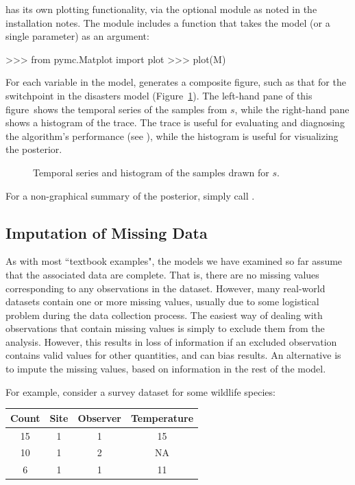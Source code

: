 \documentclass[]{jss}
\begin{document}
 has its own plotting functionality, via the optional
 module as noted in the installation notes. The
 module includes a  function that takes the
model (or a single parameter) as an argument:
\begin{CodeInput}
>>> from pymc.Matplot import plot
>>> plot(M)
\end{CodeInput}
For each variable in the model,  generates a composite figure, such as that for the switchpoint in the disasters model (Figure~\ref{fig:switch}). The left-hand pane of this figure~shows the temporal series of the samples from $s$, while the right-hand pane shows a histogram of the trace. The trace is useful for evaluating and diagnosing the algorithm's performance (see \cite*{gelman}), while the histogram is useful for visualizing the posterior.
\begin{figure}[h!]
\begin{center}
   \caption{Temporal series and histogram of the samples drawn for $s$. }
\label{fig:switch}
\end{center}
\end{figure}

For a non-graphical summary of the posterior, simply call .


\subsection{Imputation of Missing Data}


As with most ``textbook examples", the models we have examined so far assume that the associated data are complete. That is, there are no missing values corresponding to any observations in the dataset. However, many real-world datasets contain one or more missing values, usually due to some logistical problem during the data collection process. The easiest way of dealing with observations that contain missing values is simply to exclude them from the analysis. However, this results in loss of information if an excluded observation contains valid values for other quantities, and can bias results. An alternative is to impute the missing values, based on information in the rest of the model.

For example, consider a survey dataset for some wildlife species:

\begin{table}[h!]
\begin{center}
\begin{tabular}{cccc}
\hline
Count & Site & Observer & Temperature\\
\hline
15 & 1 & 1 & 15\\
10 & 1 & 2 & NA\\
6 & 1 & 1 & 11\\
\hline
\end{tabular}
\end{center}
\end{table}
\end{document}
